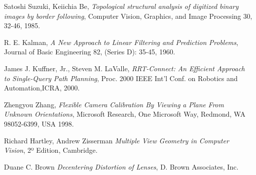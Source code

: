 \begin{thebibliography}{9}

	Satoshi Suzuki, Keiichia Be,
	\emph{Topological structural analysis of digitized binary images by border following},
	Computer Vision, Graphics, and Image Processing 30, 32-46,
	1985.
	
	R. E. Kalman,
	\emph{A New Approach to Linear Filtering and Prediction Problems},
	Journal of Basic Engineering 82, (Series D): 35-45,
	1960.

	James J. Kuffner, Jr., Steven M. LaValle,
	\emph{RRT-Connect: An Efficient Approach to Single-Query Path Planning},
	Proc. 2000 IEEE Int’l Conf. on Robotics and Automation,ICRA, 2000.

	Zhengyou Zhang,
	\emph{Flexible Camera Calibration By Viewing a Plane From Unknown Orientations},
	Microsoft Research, One Microsoft Way, Redmond, WA 98052-6399, USA
	1998.

	Richard Hartley, Andrew Zisserman
	\emph{Multiple View Geometry in Computer Vision},
	2º Edition, Cambridge.

	Duane C. Brown
	\emph{Decentering Distortion of Lenses},
	D. Brown Associates, Inc.

\end{thebibliography}